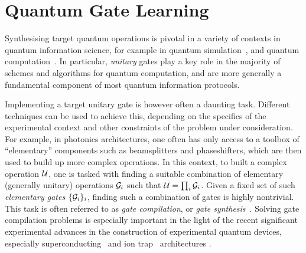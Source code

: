 
\chapter{Quantum Gate Learning}
\label{Section:GateLearning}

Synthesising target quantum operations is pivotal in a variety of contexts in quantum information science, for example in quantum simulation~\cite{feynman1982simulating,lloyd1996universal}, and quantum computation~\cite{feynman1982simulating,deutsch1985quantum,gottesman1998theory,nielsen2002quantum,ladd2010quantum}.
In particular, \emph{unitary} gates play a key role in the majority of schemes and algorithms for quantum computation, and are more generally a fundamental component of most quantum information protocols.

Implementing a target unitary gate is however often a daunting task. Different techniques can be used to achieve this, depending on the specifics of the experimental context and other constraints of the problem under consideration.
For example, in photonics architectures, one often has only access to a toolbox of ``elementary'' components such as beamsplitters and phaseshifters, which are then used to build up more complex operations.
In this context, to built a complex operation ${\mathcal{U}}$, one is tasked with finding a suitable combination of elementary (generally unitary) operations ${\mathcal{G}}_i$ such that ${\mathcal{U}}=\prod_i {\mathcal{G}}_i$. Given a fixed set of such \textit{elementary gates} $\{{\mathcal{G}}_i\}_i$, finding such a combination of gates is highly nontrivial. This task is often referred to as \textit{gate compilation}, or \textit{gate synthesis}~\cite{mottonen2004quantum,nielsen2006quantum,loke2014optqc,loke2016optqc,nakajima2009synthesis,maslov2017basic,swaddle2017generating}. 
Solving gate compilation problems is especially important in the light of the recent significant experimental advances in the construction of experimental quantum devices, especially superconducting~\cite{devoret2013superconducting} and ion trap~\cite{blatt2008entangled,debnath2016demonstration} architectures .

